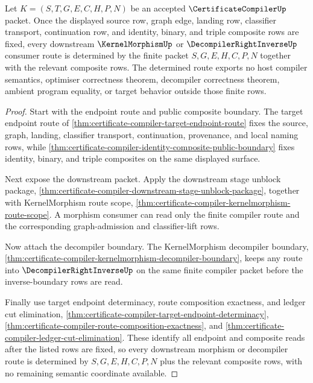 \begin{theorem}
\label{thm:certificate-compiler-endpoint-composite-determinacy}
Let $K=(S,T,G,E,C,H,P,N)$ be an accepted $\CertificateCompilerUp$ packet. Once the displayed source row, graph edge, landing row, classifier transport, continuation row, and identity, binary, and triple composite rows are fixed, every downstream $\KernelMorphismUp$ or $\DecompilerRightInverseUp$ consumer route is determined by the finite packet $S,G,E,H,C,P,N$ together with the relevant composite rows. The determined route exports no host compiler semantics, optimiser correctness theorem, decompiler correctness theorem, ambient program equality, or target behavior outside those finite rows.
\end{theorem}
\begin{proof}
Start with the endpoint route and public composite boundary. The target endpoint route of \autoref{thm:certificate-compiler-target-endpoint-route} fixes the source, graph, landing, classifier transport, continuation, provenance, and local naming rows, while \autoref{thm:certificate-compiler-identity-composite-public-boundary} fixes identity, binary, and triple composites on the same displayed surface.

Next expose the downstream packet. Apply the downstream stage unblock package, \autoref{thm:certificate-compiler-downstream-stage-unblock-package}, together with KernelMorphism route scope, \autoref{thm:certificate-compiler-kernelmorphism-route-scope}. A morphism consumer can read only the finite compiler route and the corresponding graph-admission and classifier-lift rows.

Now attach the decompiler boundary. The KernelMorphism decompiler boundary, \autoref{thm:certificate-compiler-kernelmorphism-decompiler-boundary}, keeps any route into $\DecompilerRightInverseUp$ on the same finite compiler packet before the inverse-boundary rows are read.

Finally use target endpoint determinacy, route composition exactness, and ledger cut elimination, \autoref{thm:certificate-compiler-target-endpoint-determinacy}, \autoref{thm:certificate-compiler-route-composition-exactness}, and \autoref{thm:certificate-compiler-ledger-cut-elimination}. These identify all endpoint and composite reads after the listed rows are fixed, so every downstream morphism or decompiler route is determined by $S,G,E,H,C,P,N$ plus the relevant composite rows, with no remaining semantic coordinate available.
\end{proof}

